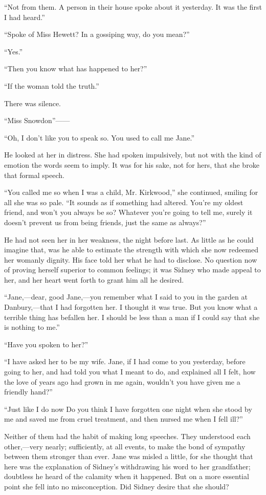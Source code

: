 ``Not from them. A person in their house spoke about it yesterday. It
was the first I had heard.''

``Spoke of Miss Hewett? In a gossiping way, do you mean?''

``Yes.''

``Then you know what has happened to her?''

``If the woman told the truth.''

There was silence.

``Miss Snowdon''{{------}}

``Oh, I don't like you to speak so. You used to call me Jane.''

He looked at her in distress. She had spoken impulsively, but not with
the kind of emotion the words seem to imply. It was for his {}sake, not
for hers, that she broke that formal speech.

``You called me so when I was a child, Mr. Kirkwood,'' she continued,
smiling for all she was so pale. ``It sounds as if something had
altered. You're my oldest friend, and won't you always be so? Whatever
you're going to tell me, surely it doesn't prevent us from being
friends, just the same as always?''

He had not seen her in her weakness, the night before last. As little as
he could imagine that, was he able to estimate the strength with which
she now redeemed her womanly dignity. His face told her what he had to
disclose. No question now of proving herself superior to common
feelings; it was Sidney who made appeal to her, and her heart went forth
to grant him all he desired.

``Jane,---dear, good Jane,---you remember what I said to you in the
garden at Danbury,---that I had forgotten her. I thought it was true.
But you know what a terrible thing has befallen her. I should be less
than a man if I could say that she is nothing to me.''

``Have you spoken to her?''

``I have asked her to be my wife. Jane, if {}I had come to you
yesterday, before going to her, and had told you what I meant to do, and
explained all I felt, how the love of years ago had grown in me again,
wouldn't you have given me a friendly hand?''

``Just like I do now Do you think I have forgotten one night when she
stood by me and saved me from cruel treatment, and then nursed me when I
fell ill?''

Neither of them had the habit of making long speeches. They understood
each other,---very nearly; sufficiently, at all events, to make the bond
of sympathy between them stronger than ever. Jane was misled a little,
for she thought that here was the explanation of Sidney's withdrawing
his word to her grandfather; doubtless he heard of the calamity when it
happened. But on a more essential point she fell into no misconception.
Did Sidney desire that she should?

